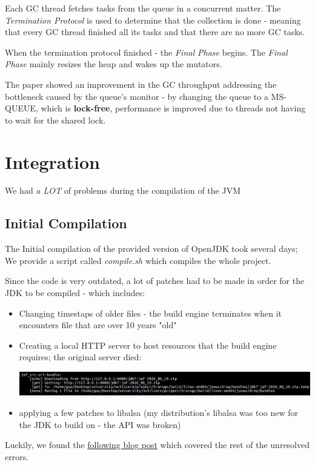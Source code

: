 \documentclass{article}
\begin{document}
 Each GC thread fetches tasks from the queue in a concurrent matter. The \textit{Termination Protocol} is used to determine that the collection is done - meaning that every GC thread finished all its tasks and that there are no more GC tasks. 
 
 When the termination protocol finished - the \textit{Final Phase} begins. The \textit{Final Phase} mainly resizes the heap and wakes up the mutators.
 
 The paper showed an improvement in the GC throughput addressing the bottleneck caused by the queue's monitor - by changing the queue to a MS-QUEUE, which is \textbf{lock-free}, performance is improved due to threads not having to wait for the shared lock.

 \newpage

 \section{Integration}
 We had \textit{a LOT} of problems during the compilation of the JVM

 \subsection{Initial Compilation}
 The Initial compilation of the provided version of OpenJDK took several days; We provide a script called \textit{compile.sh} which compiles the whole project.
 
 Since the code is very outdated, a lot of patches had to be made in order for the JDK to be compiled - which includes:
 \begin{itemize}
   \item Changing timestaps of older files - the build engine terminates when it encounters file that are over 10 years "old"
   \item Creating a local HTTP server to host resources that the build engine requires; the original server died:

   \includegraphics[width=\textwidth]{local_http_server.png}
   \item applying a few patches to libalsa (my distribution's libalsa was too new for the JDK to build on - the API was broken)
 \end{itemize}

 Luckily, we found the \href{http://www.voidcn.com/article/p-zayqisji-va.html}{following blog post} which covered the rest of the unresolved errors.
\end{document}

